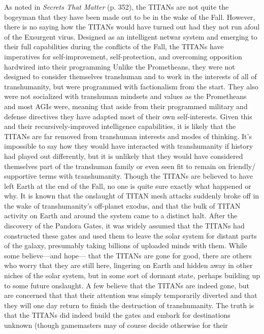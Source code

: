 As noted in \textit{Secrets That Matter} (p. 352), the TITANs 
are not quite the bogeyman that they have been made 
out to be in the wake of the Fall. However, there is no 
saying how the TITANs would have turned out had 
they not run afoul of the Exsurgent virus. Designed as 
an intelligent netwar system and emerging to their full 
capabilities during the conflicts of the Fall, the TITANs 
have imperatives for self-improvement, self-protection, 
and overcoming opposition hardwired into their programming
Unlike the Prometheans, they were not
designed to consider themselves transhuman and to 
work in the interests of all of transhumanity, but were 
programmed with factionalism from the start. They 
also were not socialized with transhuman mindsets 
and values as the Prometheans and most AGIs were, 
meaning that aside from their programmed military 
and defense directives they have adapted most of their 
own self-interests. Given this and their recursively-improved
intelligence capabilities, it is likely that the
TITANs are far removed from transhuman interests 
and modes of thinking. It's impossible to say how they 
would have interacted with transhumanity if history 
had played out differently, but it is unlikely that they 
would have considered themselves part of the transhuman
family or even seen fit to remain on friendly/
supportive terms with transhumanity.
Though the TITANs are believed to have left Earth 
at the end of the Fall, no one is quite sure exactly 
what happened or why. It is known that the onslaught 
of TITAN mesh attacks suddenly broke off in the 
wake of transhumanity's off-planet exodus, and that 
the bulk of TITAN activity on Earth and around the 
system came to a distinct halt. After the discovery 
of the Pandora Gates, it was widely assumed that 
the TITANs had constructed these gates and used 
them to leave the solar system for distant parts of 
the galaxy, presumably taking billions of uploaded 
minds with them. While some believe—and hope—
that the TITANs are gone for good, there are others 
who worry that they are still here, lingering on Earth 
and hidden away in other niches of the solar system, 
but in some sort of dormant state, perhaps building 
up to some future onslaught. A few believe that the 
TITANs are indeed gone, but are concerned that that 
their attention was simply temporarily diverted and 
that they will one day return to finish the destruction 
of transhumanity. 
The truth is that the TITANs did indeed build the 
gates and embark for destinations unknown (though 
gamemasters may of course decide otherwise for their 
